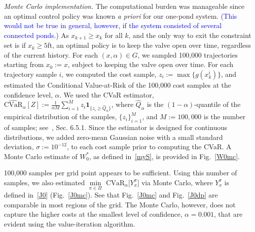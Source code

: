 \documentclass[letterpaper, 10 pt, conference]{ieeeconf}  %
\begin{document}
\textit{Monte Carlo implementation.}
The computational burden was manageable since an optimal control policy was known \textit{a priori} for our one-pond system.
\textcolor{blue}{(This would not be true in general, however, if the system consisted of several connected ponds.)} 
As $x_{k+1}\geq x_k$ for all $k$, and the only way to exit the constraint set is if $x_k \geq 5$ft,
an optimal policy is to keep the valve open over time, regardless of the current history.
For each $(x,\alpha) \in G$, we sampled 100,000 trajectories starting from $x_0 := x$, subject to keeping the valve open over time.
For each trajectory sample $i$, we computed the cost sample, $z_i := \max\{g(x_k^i)\}$, and estimated the Conditional Value-at-Risk
of the 100,000 cost samples at the confidence level, $\alpha$. 
We used the CVaR estimator, $\widehat{\text{CVaR}}_\alpha[Z] := \frac{1}{\alpha M}\sum_{i=1}^M z_i \textbf{1}_{\{z_i\geq \hat{Q}_\alpha\}}$,
where $\hat{Q}_\alpha$ is the $(1-\alpha)$-quantile of the empirical distribution of the samples, $\{z_i\}_{i=1}^M$,
and $M := 100,000$ is the number of samples; see~\cite{shapiro2009lectures}, Sec. 6.5.1.
Since the estimator is designed for continuous distributions, %
we added zero-mean Gaussian noise with a small standard deviation, $\sigma := 10^{-12}$, to each cost sample prior to computing the CVaR.
A Monte Carlo estimate of $W_0^*$, as defined in~\eqref{myS}, is provided in Fig.~\ref{W0mc}.

100,000 samples per grid point appears to be sufficient. 
Using this number of samples, we also estimated ${\underset{\pi \in \Pi}\min}\text{ CVaR}_\alpha \big[ Y_x^{\pi} \big]$ via Monte Carlo, where
$Y_x^\pi$ is defined in~\eqref{J0} (Fig.~\ref{J0mc}).\footnotemark
{}
See that Fig.~\ref{J0mc} and Fig.~\ref{J0dp} are comparable in most regions of the grid. 
The Monte Carlo, however, does not capture the higher costs at the smallest level of confidence, $\alpha = 0.001$,
that are evident using the value-iteration algorithm.   
\end{document}

